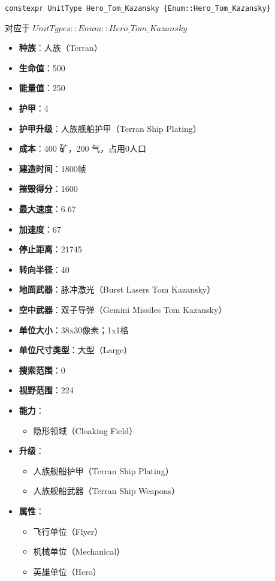 \begin{tcolorbox}[colback=white, colframe=black!60!white, title=Hero\_Tom\_Kazansky(), arc=0mm]
    \begin{verbatim}
constexpr UnitType Hero_Tom_Kazansky {Enum::Hero_Tom_Kazansky}
    \end{verbatim}
    对应于  $ UnitTypes::Enum::Hero\_Tom\_Kazansky $ 
    \begin{itemize}
        \item \textbf{种族}：人族（Terran）
        \item \textbf{生命值}：500
        \item \textbf{能量值}：250
        \item \textbf{护甲}：4
        \item \textbf{护甲升级}：人族舰船护甲（Terran Ship Plating）
        \item \textbf{成本}：400 矿，200 气，占用0人口
        \item \textbf{建造时间}：1800帧
        \item \textbf{摧毁得分}：1600
        \item \textbf{最大速度}：6.67
        \item \textbf{加速度}：67
        \item \textbf{停止距离}：21745
        \item \textbf{转向半径}：40
        \item \textbf{地面武器}：脉冲激光（Burst Lasers Tom Kazansky）
        \item \textbf{空中武器}：双子导弹（Gemini Missiles Tom Kazansky）
        \item \textbf{单位大小}：38x30像素；1x1格
        \item \textbf{单位尺寸类型}：大型（Large）
        \item \textbf{搜索范围}：0
        \item \textbf{视野范围}：224
        \item \textbf{能力}：
            \begin{itemize}
                \item 隐形领域（Cloaking Field）
            \end{itemize}
        \item \textbf{升级}：
            \begin{itemize}
                \item 人族舰船护甲（Terran Ship Plating）
                \item 人族舰船武器（Terran Ship Weapons）
            \end{itemize}
        \item \textbf{属性}：
            \begin{itemize}
                \item 飞行单位（Flyer）
                \item 机械单位（Mechanical）
                \item 英雄单位（Hero）
            \end{itemize}
    \end{itemize}
\end{tcolorbox}

